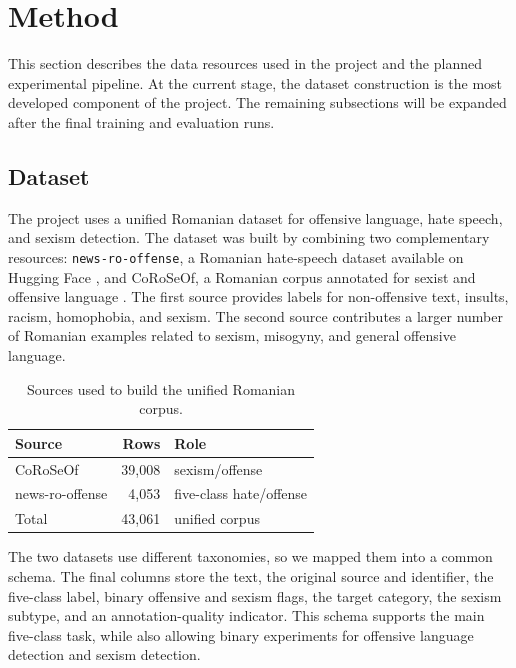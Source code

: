 \section{Method}
\label{sec:method}

This section describes the data resources used in the project and the planned experimental pipeline. At the current stage, the dataset construction is the most developed component of the project. The remaining subsections will be expanded after the final training and evaluation runs.

\subsection{Dataset}
\label{subsec:dataset}

The project uses a unified Romanian dataset for offensive language, hate speech, and sexism detection. The dataset was built by combining two complementary resources: \texttt{news-ro-offense}, a Romanian hate-speech dataset available on Hugging Face \citep{readerbenchNewsRoOffense}, and CoRoSeOf, a Romanian corpus annotated for sexist and offensive language \citep{coroseof}. The first source provides labels for non-offensive text, insults, racism, homophobia, and sexism. The second source contributes a larger number of Romanian examples related to sexism, misogyny, and general offensive language.

\begin{table}[H]
\centering
\small
\begin{tabular}{lrl}
\toprule
Source & Rows & Role \\
\midrule
CoRoSeOf & 39,008 & sexism/offense \\
news-ro-offense & 4,053 & five-class hate/offense \\
\midrule
Total & 43,061 & unified corpus \\
\bottomrule
\end{tabular}
\caption{Sources used to build the unified Romanian corpus.}
\label{tab:dataset_sources}
\end{table}

The two datasets use different taxonomies, so we mapped them into a common schema. The final columns store the text, the original source and identifier, the five-class label, binary offensive and sexism flags, the target category, the sexism subtype, and an annotation-quality indicator. This schema supports the main five-class task, while also allowing binary experiments for offensive language detection and sexism detection.

